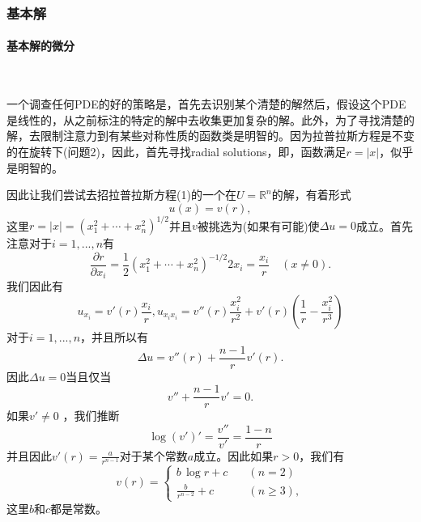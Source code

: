 \documentclass[leqno]{article}
\numberwithin{equation}{subsection}%
\begin{document}
\subsubsection{基本解}
\renewcommand{\theparagraph}{\alph{paragraph}.}
\paragraph{基本解的微分}~{}
\par
一个调查任何PDE的好的策略是，首先去识别某个清楚的解然后，假设这个PDE是线性的，从之前标注的特定的解中去收集更加复杂的解。此外，为了寻找清楚的解，去限制注意力到有某些对称性质的函数类是明智的。因为拉普拉斯方程是不变的在旋转下(问题2)，因此，首先寻找radial solutions，即，函数满足$r=|x|$，似乎是明智的。
\par
因此让我们尝试去招拉普拉斯方程(1)的一个在$U=\mathbb{R}^{n}$的解，有着形式
\begin{equation*}
u(x)=v(r),
\end{equation*}
这里$r=|x|=\left(x_{1}^{2}+\cdots+x_{n}^{2}\right)^{1/2}$并且$v$被挑选为(如果有可能)使$\Delta u=0$成立。首先注意对于$i=1,...,n$有
\begin{equation*}
\frac{\partial r}{\partial x_{i}}=\frac{1}{2}\left(x_{1}^{2}+\cdots+x_{n}^{2}\right)^{-1/2}2x_{i}=\frac{x_{i}}{r}\quad(x\neq 0).
\end{equation*}
我们因此有
\begin{equation*}
u_{x_{i}}=v'(r)\frac{x_{i}}{r},u_{x_{i}x_{i}}=v''(r)\frac{x_{i}^{2}}{r^{2}}+v'(r)\left(\frac{1}{r}-\frac{x_{i}^{2}}{r^{3}}\right)
\end{equation*}
对于$i=1,...,n$，并且所以有
\begin{equation*}
\Delta u=v''(r)+\frac{n-1}{r}v'(r).
\end{equation*}
因此$\Delta u=0$当且仅当
\begin{equation}
v''+\frac{n-1}{r}v'=0.
\end{equation}
如果$v'\neq 0$ ，我们推断
\begin{equation*}
\log (v')'=\frac{v''}{v'}=\frac{1-n}{r}
\end{equation*}
并且因此$v'(r)=\frac{a}{r^{n-1}}$对于某个常数$a$成立。因此如果$r>0$，我们有
\begin{equation*}
v(r)=
\begin{cases}
b\,\log r+c\quad&(n=2)\\
\frac{b}{r^{n-2}}+c&(n\geq 3),
\end{cases}
\end{equation*}
这里$b$和$c$都是常数。
\par
\end{document}
